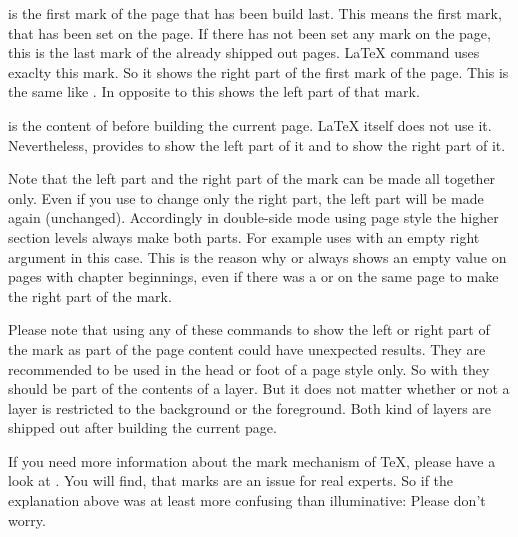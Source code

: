  is the first mark of the page that has been build last. This
means the first mark, that has been set on the page. If there has not been set
any mark on the page, this is the last mark of the already shipped out
pages. \LaTeX{} command  uses exaclty this mark. So it shows
the right part of the first mark of the page. This is the same like
. In opposite to this  shows the
left part of that mark.

 is the content of  before building the current
page. \LaTeX{} itself does not use it. Nevertheless, 
provides  to show the left part of it and
 to show the right part of it.

Note that the left part and the right part of the mark
can be made all together only. Even if you use
 to change only the right part, the left
part will be made again (unchanged). Accordingly in double-side mode using
page style
the higher section levels always make both parts. For example
 uses  with an empty right argument in this
case. This is the reason why  or 
always shows an empty value on pages with chapter beginnings, even if there
was a  or  on the same page to make the
right part of the mark.

Please note that using any of these commands to show the
left or right part of the mark as part of the page content could have
unexpected results. They are recommended to be used in the head or foot of a
page style only. So with  they should be part of the
contents of a layer. But it does not matter whether or not a layer is
restricted to the background or the foreground. Both kind of layers are
shipped out after building the current page.

If you need more information about the mark mechanism of \TeX, please have a
look at \cite[chapter~23]{knuth:texbook}. You will find, that marks are an
issue for real experts. So if the explanation above was at least more
confusing than illuminative: Please don't worry.
%
%
%
%
%
%
%
\fi

